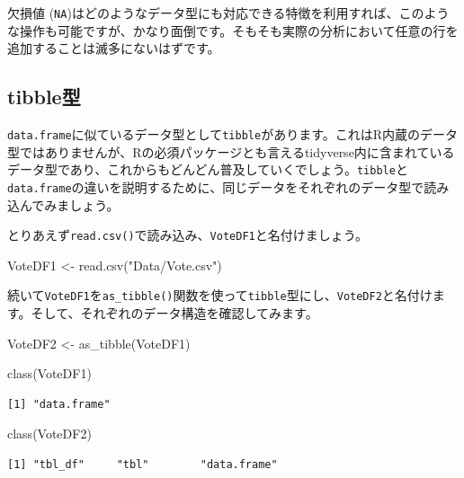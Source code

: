 \documentclass[
  a4paper,
  pandoc,
  ja=standard,
  jafont=haranoaji]{bxjsbook}
\newenvironment{Shaded}{\begin{snugshade}}{\end{snugshade}}
\newcommand{\FunctionTok}[1]{\textcolor[rgb]{0.28,0.35,0.67}{#1}}
\newcommand{\NormalTok}[1]{\textcolor[rgb]{0.00,0.48,0.65}{#1}}
\newcommand{\OtherTok}[1]{\textcolor[rgb]{0.00,0.48,0.65}{#1}}
\newcommand{\StringTok}[1]{\textcolor[rgb]{0.13,0.47,0.30}{#1}}
\begin{document}
欠損値
(\texttt{NA})はどのようなデータ型にも対応できる特徴を利用すれば、このような操作も可能ですが、かなり面倒です。そもそも実際の分析において任意の行を追加することは滅多にないはずです。

\hypertarget{tibbleux578b}{%
\subsection{tibble型}\label{tibbleux578b}}

\texttt{data.frame}に似ているデータ型として\texttt{tibble}があります。これはR内蔵のデータ型ではありませんが、Rの必須パッケージとも言えるtidyverse内に含まれているデータ型であり、これからもどんどん普及していくでしょう。\texttt{tibble}と\texttt{data.frame}の違いを説明するために、同じデータをそれぞれのデータ型で読み込んでみましょう。

とりあえず\texttt{read.csv()}で読み込み、\texttt{VoteDF1}と名付けましょう。

\begin{Shaded}
\begin{Highlighting}[numbers=left,,]
\NormalTok{VoteDF1 }\OtherTok{\textless{}{-}} \FunctionTok{read.csv}\NormalTok{(}\StringTok{"Data/Vote.csv"}\NormalTok{)}
\end{Highlighting}
\end{Shaded}

続いて\texttt{VoteDF1}を\texttt{as\_tibble()}関数を使って\texttt{tibble}型にし、\texttt{VoteDF2}と名付けます。そして、それぞれのデータ構造を確認してみます。

\begin{Shaded}
\begin{Highlighting}[numbers=left,,]
\NormalTok{VoteDF2 }\OtherTok{\textless{}{-}} \FunctionTok{as\_tibble}\NormalTok{(VoteDF1)}

\FunctionTok{class}\NormalTok{(VoteDF1)}
\end{Highlighting}
\end{Shaded}

\begin{verbatim}
[1] "data.frame"
\end{verbatim}

\begin{Shaded}
\begin{Highlighting}[numbers=left,,]
\FunctionTok{class}\NormalTok{(VoteDF2)}
\end{Highlighting}
\end{Shaded}

\begin{verbatim}
[1] "tbl_df"     "tbl"        "data.frame"
\end{verbatim}
\end{document}
